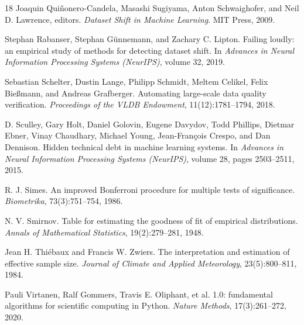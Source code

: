 \documentclass[11pt]{article}
\begin{document}
\begin{thebibliography}{18}
Joaquin Qui{\~n}onero-Candela, Masashi Sugiyama, Anton Schwaighofer, and Neil D. Lawrence, editors.
\newblock \emph{Dataset Shift in Machine Learning}.
\newblock MIT Press, 2009.

Stephan Rabanser, Stephan G{\"u}nnemann, and Zachary C. Lipton.
\newblock Failing loudly: an empirical study of methods for detecting dataset shift.
\newblock In \emph{Advances in Neural Information Processing Systems (NeurIPS)}, volume 32, 2019.

Sebastian Schelter, Dustin Lange, Philipp Schmidt, Meltem Celikel, Felix Bie{\ss}mann, and Andreas Grafberger.
\newblock Automating large-scale data quality verification.
\newblock \emph{Proceedings of the VLDB Endowment}, 11(12):1781--1794, 2018.

D. Sculley, Gary Holt, Daniel Golovin, Eugene Davydov, Todd Phillips, Dietmar Ebner, Vinay Chaudhary, Michael Young, Jean-Fran{\c{c}}ois Crespo, and Dan Dennison.
\newblock Hidden technical debt in machine learning systems.
\newblock In \emph{Advances in Neural Information Processing Systems (NeurIPS)}, volume 28, pages 2503--2511, 2015.

R. J. Simes.
\newblock An improved Bonferroni procedure for multiple tests of significance.
\newblock \emph{Biometrika}, 73(3):751--754, 1986.

N. V. Smirnov.
\newblock Table for estimating the goodness of fit of empirical distributions.
\newblock \emph{Annals of Mathematical Statistics}, 19(2):279--281, 1948.

Jean H. Thi{\'e}baux and Francis W. Zwiers.
\newblock The interpretation and estimation of effective sample size.
\newblock \emph{Journal of Climate and Applied Meteorology}, 23(5):800--811, 1984.

Pauli Virtanen, Ralf Gommers, Travis E. Oliphant, et al.
 1.0: fundamental algorithms for scientific computing in {Python}.
\newblock \emph{Nature Methods}, 17(3):261--272, 2020.

\end{thebibliography}
\end{document}
